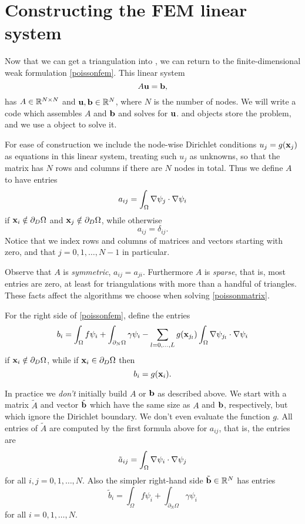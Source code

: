 \section{Constructing the FEM linear system}

Now that we can get a triangulation into \PETSc, we can return to the finite-dimensional weak formulation \eqref{poissonfem}.  This linear system
\begin{equation}
A \mathbf{u} = \mathbf{b}, \label{poissonmatrix}
\end{equation}
has $A\in\mathbb{R}^{N\times N}$ and $\mathbf{u},\mathbf{b}\in\mathbb{R}^N$, where $N$ is the number of nodes.  We will write a code which assembles $A$ and $\mathbf{b}$ and solves for $\mathbf{u}$.  \PETSc \pMat and \pVec objects store the problem, and we use a \pKSP object to solve it.

For ease of construction we include the node-wise Dirichlet conditions $u_j=g(\mathbf{x}_j)$ as equations in this linear system, treating such $u_j$ as unknowns, so that the matrix has $N$ rows and columns if there are $N$ nodes in total.  Thus we define $A$ to have entries
\begin{equation}
a_{ij} = \int_\Omega \nabla \psi_j \cdot \nabla \psi_i \label{Aentryfem}
\end{equation}
if $\mathbf{x}_i \notin \partial_D \Omega$ and $\mathbf{x}_j \notin \partial_D \Omega$, while otherwise
\begin{equation*}
a_{ij} = \delta_{ij}.
\end{equation*}
Notice that we index rows and columns of matrices and vectors starting with zero, and that $j=0,1,\dots,N-1$ in particular.

Observe that $A$ is \emph{symmetric}, $a_{ij}=a_{ji}$.  Furthermore $A$ is \emph{sparse}, that is, most entries are zero, at least for triangulations with more than a handful of triangles.  These facts affect the algorithms we choose when solving \eqref{poissonmatrix}.

For the right side of \eqref{poissonfem}, define the entries
\begin{equation}
    b_i = \int_\Omega f \psi_i + \int_{\partial_N\Omega} \gamma \psi_i - \sum_{l=0,\dots,L} g(\mathbf{x}_{j_l})  \int_\Omega \nabla \psi_{j_l} \cdot \nabla \psi_i  \label{bentryfem}
\end{equation}
if $\mathbf{x}_i \notin \partial_D \Omega$, while if $\mathbf{x}_i \in \partial_D \Omega$ then
    $$b_i = g(\mathbf{x}_{i}).$$

In practice we \emph{don't} initially build $A$ or $\mathbf{b}$ as described above.  We start with a matrix $\tilde A$ and vector $\tilde {\mathbf{b}}$ which have the same size as $A$ and $\mathbf{b}$, respectively, but which ignore the Dirichlet boundary.  We don't even evaluate the function $g$.  All entries of $\tilde A$ are computed by the first formula above for $a_{ij}$, that is, the entries are
\begin{equation*}
\tilde a_{ij} = \int_\Omega \nabla \psi_i \cdot \nabla \psi_j
\end{equation*}
for all $i,j=0,1,\dots,N$.  Also the simpler right-hand side $\tilde {\mathbf{b}}\in\mathbb{R}^N$ has entries
    $$\tilde b_i = \int_\Omega f \psi_i + \int_{\partial_N\Omega} \gamma \psi_i$$
for all $i=0,1,\dots,N$.

